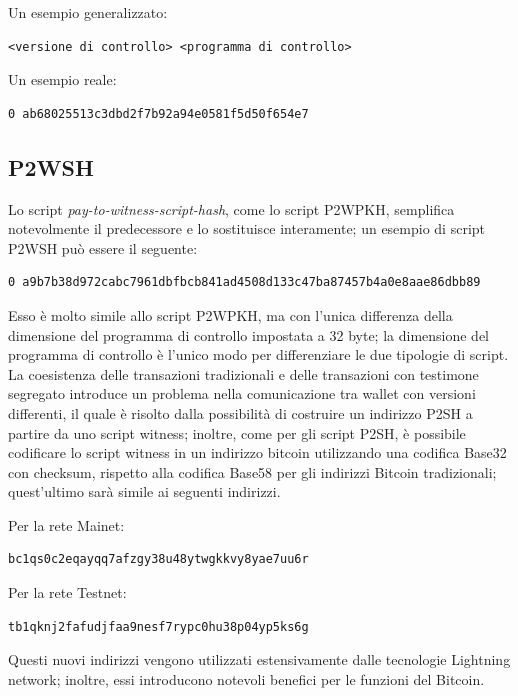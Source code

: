 Un esempio generalizzato:
\begin{lstlisting}[language=bitcoinscript, label={code:generalexamplep2wpkh}, caption={Esempio generale della struttura di uno script P2WPKH.}]
<versione di controllo> <programma di controllo>
\end{lstlisting}

Un esempio reale:
\begin{lstlisting}[language=bitcoinscript, label={code:xamplep2wpkh}, caption={Esempio reale di uno script P2WPKH.}]
0 ab68025513c3dbd2f7b92a94e0581f5d50f654e7
\end{lstlisting}

\subsection{P2WSH}

Lo script \emph{pay-to-witness-script-hash}, come lo script P2WPKH, semplifica notevolmente il predecessore e lo sostituisce interamente; un esempio di script P2WSH può essere il seguente:
\begin{lstlisting}[language=bitcoinscript, label={code:examplep2wsh}, caption={Esempio di uno script P2WSH.}]
0 a9b7b38d972cabc7961dbfbcb841ad4508d133c47ba87457b4a0e8aae86dbb89
\end{lstlisting}
Esso è molto simile allo script P2WPKH, ma con l’unica differenza della dimensione del programma di controllo impostata a 32 byte; la dimensione del programma di controllo è l’unico modo per differenziare le due tipologie di script.
La coesistenza delle transazioni tradizionali e delle transazioni con testimone segregato introduce  un problema nella comunicazione tra wallet con versioni differenti, il quale è risolto dalla possibilità di costruire un indirizzo P2SH a partire da uno script witness; inoltre, come per gli script P2SH, è possibile codificare lo script witness in un indirizzo bitcoin utilizzando una codifica Base32 con checksum, rispetto alla codifica Base58 per gli indirizzi Bitcoin tradizionali; quest’ultimo sarà simile ai seguenti indirizzi.

Per la rete Mainet:
\begin{lstlisting}[language=bitcoinscript, label={code:examplep2wsh}, caption={Address base32 della rete mainet.}]
bc1qs0c2eqayqq7afzgy38u48ytwgkkvy8yae7uu6r
\end{lstlisting}
Per la rete Testnet:
\begin{lstlisting}[language=bitcoinscript, label={code:examplep2wsh}, caption={Address base32 della rete testnet.}]
tb1qknj2fafudjfaa9nesf7rypc0hu38p04yp5ks6g
\end{lstlisting}
Questi nuovi indirizzi vengono utilizzati estensivamente dalle tecnologie Lightning network; inoltre, essi introducono notevoli benefici per le funzioni del Bitcoin.

